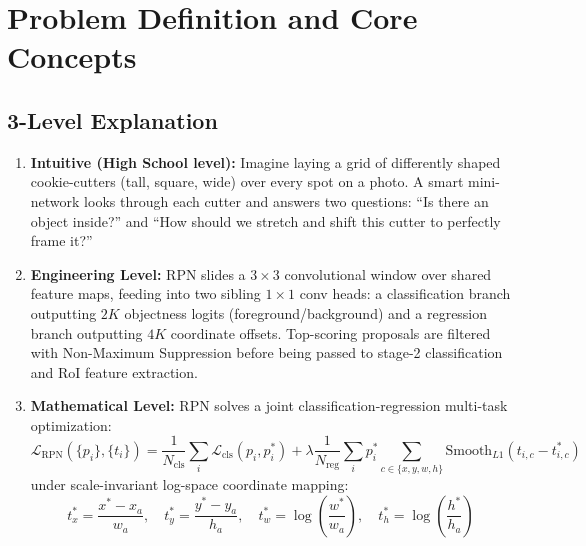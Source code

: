 \documentclass[11pt,a4paper]{article}
\theoremstyle{definition}
\begin{document}
\section{Problem Definition and Core Concepts}

\subsection{3-Level Explanation}
\begin{enumerate}
    \item \textbf{Intuitive (High School level):} Imagine laying a grid of differently shaped cookie-cutters (tall, square, wide) over every spot on a photo. A smart mini-network looks through each cutter and answers two questions: ``Is there an object inside?'' and ``How should we stretch and shift this cutter to perfectly frame it?''
    \item \textbf{Engineering Level:} RPN slides a $3 \times 3$ convolutional window over shared feature maps, feeding into two sibling $1 \times 1$ conv heads: a classification branch outputting $2K$ objectness logits (foreground/background) and a regression branch outputting $4K$ coordinate offsets. Top-scoring proposals are filtered with Non-Maximum Suppression before being passed to stage-2 classification and RoI feature extraction.
    \item \textbf{Mathematical Level:} RPN solves a joint classification-regression multi-task optimization:
    \begin{equation}
    \mathcal{L}_{\text{RPN}}(\{p_i\}, \{t_i\}) = \frac{1}{N_{\text{cls}}} \sum_{i} \mathcal{L}_{\text{cls}}(p_i, p_i^*) + \lambda \frac{1}{N_{\text{reg}}} \sum_{i} p_i^* \sum_{c \in \{x,y,w,h\}} \text{Smooth}_{L1}(t_{i,c} - t_{i,c}^*)
    \end{equation}
    under scale-invariant log-space coordinate mapping:
    \begin{equation}
    t_x^* = \frac{x^* - x_a}{w_a}, \quad t_y^* = \frac{y^* - y_a}{h_a}, \quad t_w^* = \log\left(\frac{w^*}{w_a}\right), \quad t_h^* = \log\left(\frac{h^*}{h_a}\right)
    \end{equation}
\end{enumerate}
\end{document}
